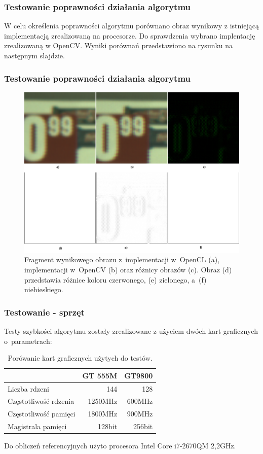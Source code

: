 \documentclass{beamer}
\begin{document}
\begin{frame}
  \frametitle{Testowanie poprawności działania algorytmu}

W celu określenia poprawności algorytmu porównano obraz wynikowy z istniejącą implementacją zrealizowaną na procesorze. Do sprawdzenia wybrano implentację zrealizowaną w OpenCV. Wyniki porównań przedstawiono na rysunku na następnym slajdzie.

\end{frame}

\begin{frame}
  \frametitle{Testowanie poprawności działania algorytmu}
\begin{figure}
  \centering
  \includegraphics[width=0.55\linewidth]{result_diff}
  \caption{Fragment wynikowego obrazu z~implementacji w~OpenCL (a), implementacji w~OpenCV (b) oraz różnicy obrazów (c). Obraz (d) przedstawia różnice koloru czerwonego, (e) zielonego, a~(f) niebieskiego.}
  \label{fig:result_diff}
\end{figure}
\end{frame}

\begin{frame}
  \frametitle{Testowanie - sprzęt}
  Testy szybkości algorytmu zostały zrealizowane z użyciem dwóch kart graficznych o~parametrach:
\begin{center}
\begin{table}
  \caption{Porówanie kart graficznych użytych do testów.}
  \label{tab:gpus}
     \begin{tabular}{ |l | r | r | }
     \hline
       & GT 555M & GT9800 \\ \hline
     Liczba rdzeni & 144 & 128 \\ \hline
     Częstotliwość rdzenia & 1250MHz & 600MHz \\ \hline
     Częstotliwość pamięci & 1800MHz & 900MHz \\ \hline
     Magistrala pamięci & 128bit & 256bit \\ \hline

   \end{tabular}

\end{table}
\end{center}
Do obliczeń referencyjnych użyto procesora Intel Core i7-2670QM 2,2GHz.
\end{frame}
\end{document}
